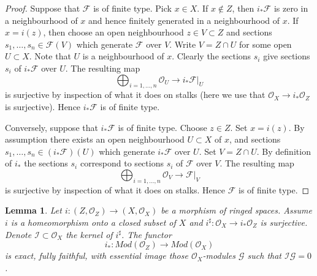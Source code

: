\documentclass{stacks-project}
\theoremstyle{plain}
\newtheorem{lemma}[subsection]{Lemma}
\theoremstyle{definition}
\theoremstyle{remark}
\numberwithin{equation}{subsection}
\begin{document}
\begin{proof}
Suppose that $\mathcal{F}$ is of finite type.
Pick $x \in X$. If $x \not \in Z$, then $i_*\mathcal{F}$
is zero in a neighbourhood of $x$ and hence finitely generated in
a neighbourhood of $x$. If $x = i(z)$, then choose an open neighbourhood
$z \in V \subset Z$ and sections $s_1, \ldots, s_n \in \mathcal{F}(V)$
which generate $\mathcal{F}$ over $V$. Write $V = Z \cap U$ for some open
$U \subset X$. Note that $U$ is a neighbourhood of $x$. Clearly the
sections $s_i$ give sections $s_i$ of $i_*\mathcal{F}$ over $U$.
The resulting map
$$
\bigoplus\nolimits_{i = 1, \ldots, n} \mathcal{O}_U
\longrightarrow
i_*\mathcal{F}|_U
$$
is surjective by inspection of what it does on stalks
(here we use that $\mathcal{O}_X \to i_*\mathcal{O}_Z$
is surjective). Hence $i_*\mathcal{F}$
is of finite type.

\medskip\noindent
Conversely, suppose that $i_*\mathcal{F}$ is of finite type.
Choose $z \in Z$. Set $x = i(z)$. By assumption there exists
an open neighbourhood $U \subset X$ of $x$, and sections
$s_1, \ldots, s_n \in (i_*\mathcal{F})(U)$ which generate $i_*\mathcal{F}$
over $U$. Set $V = Z \cap U$. By definition of $i_*$ the sections
$s_i$ correspond to sections $s_i$ of $\mathcal{F}$ over $V$.
The resulting map
$$
\bigoplus\nolimits_{i = 1, \ldots, n} \mathcal{O}_V
\longrightarrow
\mathcal{F}|_V
$$
is surjective by inspection of what it does on stalks. Hence
$\mathcal{F}$ is of finite type.
\end{proof}

\begin{lemma}
\label{lemma-i-star-equivalence}
Let $i : (Z, \mathcal{O}_Z) \to (X, \mathcal{O}_X)$ be a morphism
of ringed spaces. Assume $i$ is a homeomorphism onto a closed subset of $X$
and $i^\sharp : \mathcal{O}_X \to i_*\mathcal{O}_Z$ is surjective.
Denote $\mathcal{I} \subset \mathcal{O}_X$ the kernel of $i^\sharp$.
The functor
$$
i_* :
\textit{Mod}(\mathcal{O}_Z)
\longrightarrow
\textit{Mod}(\mathcal{O}_X)
$$
is exact, fully faithful, with essential image those
$\mathcal{O}_X$-modules $\mathcal{G}$ such that $\mathcal{I}\mathcal{G} = 0$.
\end{lemma}
\end{document}
